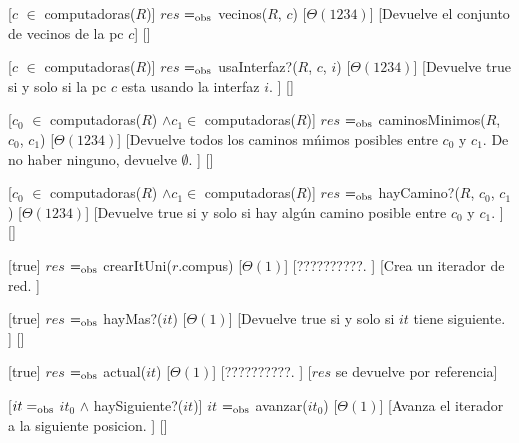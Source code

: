 \begin{Interfaz}
  [$c$ $\in$ computadoras($R$)]%
  {$res$ $=_{\mathrm{obs}}$ vecinos($R$, $c$)}%
  [$\Theta(1234)$]%
  [Devuelve el conjunto de vecinos de la pc $c$]%
  []%
  
  [$c$ $\in$ computadoras($R$)]%
  {$res$ $=_{\mathrm{obs}}$ usaInterfaz?($R$, $c$, $i$)}%
  [$\Theta(1234)$]%
  [Devuelve true si y solo si la pc $c$ esta usando la interfaz $i$. ]%
  []%
  
  [$c_{0}$ $\in$ computadoras($R$) $\land c_{1} \in $ computadoras($R$)]%
  {$res$ $=_{\mathrm{obs}}$ caminosMinimos($R$, $c_{0}$, $c_{1}$)}%
  [$\Theta(1234)$]%
  [Devuelve todos los caminos m\'nimos posibles entre $c_{0}$ y $c_{1}$. De no haber ninguno, devuelve $\emptyset$. ]%
  []%
  
  [$c_{0}$ $\in$ computadoras($R$) $\land c_{1} \in $ computadoras($R$)]%
  {$res$ $=_{\mathrm{obs}}$ hayCamino?($R$, $c_{0}$, $c_{1}$)}%
  [$\Theta(1234)$]%
  [Devuelve true si y solo si hay alg\'un camino posible entre $c_{0}$ y $c_{1}$. ]%
  []%


  [true]%
  {$res$ $=_{\mathrm{obs}}$ crearItUni($r$.compus)}%
  [$\Theta(1)$]%
  [??????????. ]%
  [Crea un iterador de red. ]%

  [true]%
  {$res$ $=_{\mathrm{obs}}$ hayMas?($it$)}%
  [$\Theta(1)$]%
  [Devuelve true si y solo si $it$ tiene siguiente. ]%
  []%

  [true]%
  {$res$ $=_{\mathrm{obs}}$ actual($it$)}%
  [$\Theta(1)$]%
  [??????????. ]%
  [$res$ se devuelve por referencia]%

  [$it =_{\mathrm{obs}}$ $it_{0}$ $\land$ haySiguiente?($it$)]%
  {$it$ $=_{\mathrm{obs}}$ avanzar($it_{0}$)}%
  [$\Theta(1)$]%
  [Avanza el iterador a la siguiente posicion. ]%
  []%

\end{Interfaz}

